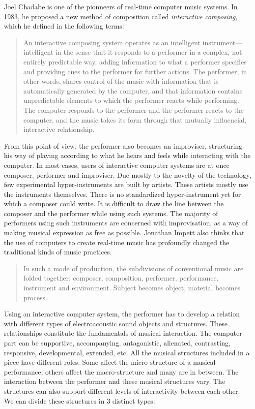 Joel Chadabe is one of the pionneers of real-time computer music systems. In 1983, he proposed a new method of composition called \emph{interactive composing}, which he defined in the following terms: 

\begin{quotation}
An interactive composing system operates as an intelligent instrument---intelligent in the sense that it responds to a performer in a complex, not entirely predictable way, adding information to what a performer specifies and providing cues to the performer for further actions. The performer, in other words, shares control of the music with information that is automatically generated by the computer, and that information contains unpredictable elements to which the performer reacts while performing. The computer responds to the performer and the performer reacts to the computer, and the music takes its form through that mutually influencial, interactive relationship. \cite[p.144]{Chadabe:1989}
\end{quotation}

From this point of view, the performer also becomes an improviser, structuring his way of playing according to what he hears and feels while interacting with the computer. In most cases, users of interactive computer systems are at once composer, performer and improviser. Due mostly to the novelty of the technology, few experimental hyper-instruments are built by artists. These artists mostly use the instruments themselves. There is no standardized hyper-instrument yet for which a composer could write. It is difficult to draw the line between the composer and the performer while using such systems. The majority of performers using such instruments are concerned with improvisation, as a way of making musical expression as free as possible.  Jonathan Impett also thinks that the use of computers to create real-time music has profoundly changed the traditional kinds of music practices. 

\begin{quotation}
In such a mode of production, the subdivisions of conventional music are folded together: composer, composition, performer, performance, instrument and environment. Subject becomes object, material becomes process. \cite[p.24]{Impett:1998}
\end{quotation}


Using an interactive computer system, the performer has to develop a relation with different types of electroacoustic sound objects and structures. These relationships constitute the fundamentals of musical interaction. The computer part can be supportive, accompanying, antagonistic, alienated, contrasting, responsive, developmental, extended, etc. All the musical structures included in a piece have different roles. Some affect the micro-structure of a musical performance, others affect the macro-structure and many are in between. The interaction between the performer and these musical structures vary. The structures can also support different levels of interactivity between each other. We can divide these structures in 3 distinct types: 

